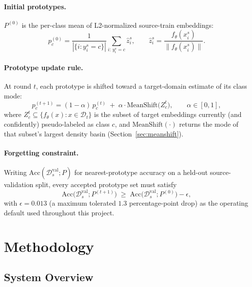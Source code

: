 \documentclass[11pt]{article}
\begin{document}
\paragraph{Initial prototypes.} $P^{(0)}$ is the per-class mean of L2-normalized source-train
embeddings:
\begin{equation}
p_c^{(0)} = \frac{1}{|\{i : y_i^s = c\}|} \sum_{i:\, y_i^s = c} \hat{z}_i^s,
\qquad \hat{z}_i^s = \frac{f_\theta(x_i^s)}{\lVert f_\theta(x_i^s) \rVert}.
\end{equation}

\paragraph{Prototype update rule.} At round $t$, each prototype is shifted toward a
target-domain estimate of its class mode:
\begin{equation}
\label{eq:update}
p_c^{(t+1)} = (1 - \alpha)\, p_c^{(t)} \; + \; \alpha \cdot \mathrm{MeanShift}\big(Z_c^t\big),
\qquad \alpha \in [0, 1],
\end{equation}
where $Z_c^t \subseteq \{f_\theta(x) : x \in \mathcal{D}_t\}$ is the subset of target embeddings
currently (and confidently) pseudo-labeled as class $c$, and $\mathrm{MeanShift}(\cdot)$ returns
the mode of that subset's largest density basin (Section~\ref{sec:meanshift}).

\paragraph{Forgetting constraint.} Writing $\mathrm{Acc}(\mathcal{D}_s^{\mathrm{val}}; P)$ for
nearest-prototype accuracy on a held-out source-validation split, every accepted prototype set
must satisfy
\begin{equation}
\label{eq:bound}
\mathrm{Acc}\big(\mathcal{D}_s^{\mathrm{val}}; P^{(t+1)}\big) \; \geq \;
\mathrm{Acc}\big(\mathcal{D}_s^{\mathrm{val}}; P^{(0)}\big) - \epsilon,
\end{equation}
with $\epsilon = 0.013$ (a maximum tolerated $1.3$ percentage-point drop) as the operating
default used throughout this project.

\section{Methodology}

\subsection{System Overview}
\end{document}
